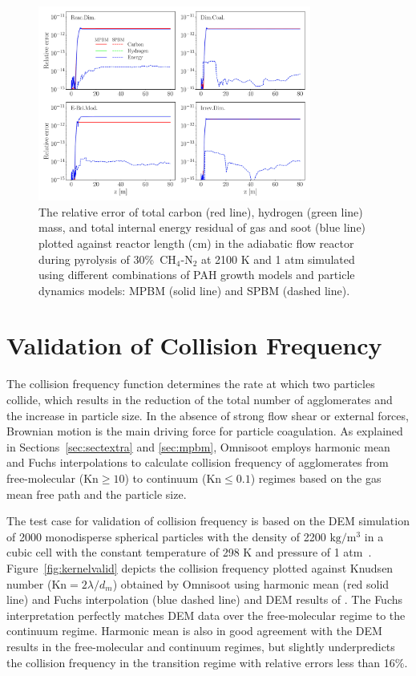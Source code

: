 \begin{figure}[H]
	\centering
	\includegraphics[width=0.8\textwidth]{Figures/Results/Validation/PFR/relerr_pfr.pdf}
	\caption{The relative error of total carbon (red line), hydrogen (green line) mass, and total internal energy residual of gas and soot (blue line) plotted against reactor length (cm) in the adiabatic flow reactor during pyrolysis of 30\%~$\mathrm{CH_4}$-$\mathrm{N_2}$ at 2100 K and 1 atm simulated using different combinations of PAH growth models and particle dynamics models: MPBM (solid line) and SPBM (dashed line).}
	\label{fig:pfrvalid}
\end{figure}


\section{Validation of Collision Frequency}
\label{sec:validcolfreq}
The collision frequency function determines the rate at which two particles collide, which results in the reduction of the total number of agglomerates and the increase in particle size. In the absence of strong flow shear or external forces, Brownian motion is the main driving force for particle coagulation. As explained in Sections~\ref{sec:sectextra} and \ref{sec:mpbm}, Omnisoot employs harmonic mean and Fuchs interpolations to calculate collision frequency of agglomerates from free-molecular ($\mathrm{Kn}\ge10$) to continuum ($\mathrm{Kn}\le0.1$) regimes based on the gas mean free path and the particle size. 


The test case for validation of collision frequency is based on the DEM simulation of 2000 monodisperse spherical particles with the density of 2200 $\mathrm{kg/m^3}$ in
a cubic cell with the constant temperature of 298 K and pressure of 1 atm~\citep{goudeli2015coagulation}. Figure~\ref{fig:kernelvalid} depicts the collision frequency plotted against Knudsen number ($\mathrm{Kn}=2\lambda/d_m$) obtained by Omnisoot using harmonic mean (red solid line) and Fuchs interpolation (blue dashed line) and DEM results of \citet{goudeli2015coagulation}. The Fuchs interpretation perfectly matches DEM data over the free-molecular regime to the continuum regime. Harmonic mean is also in good agreement with the DEM results in the free-molecular and continuum regimes, but slightly underpredicts the collision frequency in the transition regime with relative errors less than 16\%.


